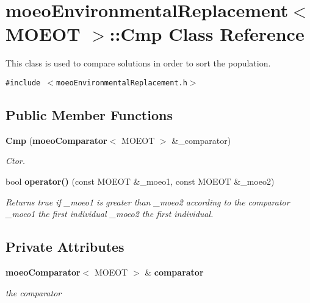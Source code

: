 \section{moeo\-Environmental\-Replacement$<$ MOEOT $>$::Cmp Class Reference}
\label{classmoeoEnvironmentalReplacement_1_1Cmp}
This class is used to compare solutions in order to sort the population.  


{\tt \#include $<$moeo\-Environmental\-Replacement.h$>$}

\subsection*{Public Member Functions}
\begin{CompactItemize}
\item 
{\bf Cmp} ({\bf moeo\-Comparator}$<$ MOEOT $>$ \&\_\-comparator)
\begin{CompactList}\small\item\em Ctor. \item\end{CompactList}\item 
bool {\bf operator()} (const MOEOT \&\_\-moeo1, const MOEOT \&\_\-moeo2)\label{classmoeoEnvironmentalReplacement_1_1Cmp_b006918d5d6fc1f87fb9ed585946595a}

\begin{CompactList}\small\item\em Returns true if \_\-moeo1 is greater than \_\-moeo2 according to the comparator \_\-moeo1 the first individual \_\-moeo2 the first individual. \item\end{CompactList}\end{CompactItemize}
\subsection*{Private Attributes}
\begin{CompactItemize}
\item 
{\bf moeo\-Comparator}$<$ MOEOT $>$ \& {\bf comparator}\label{classmoeoEnvironmentalReplacement_1_1Cmp_7d2cc653e0ec997e72381a3f191a30df}

\begin{CompactList}\small\item\em the comparator \item\end{CompactList}\end{CompactItemize}


